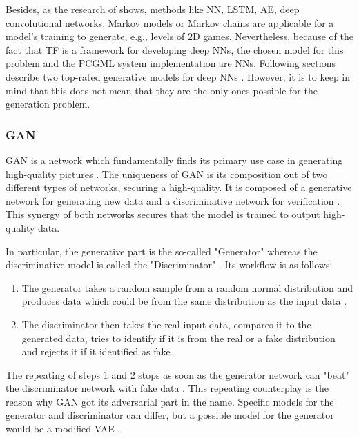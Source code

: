 \documentclass[MGS,Master,english]{twbook}%
\begin{document}
Besides, as the research of \cite{pcgml::paper} shows, methods like \ac{NN}, \ac{LSTM}, \ac{AE}, deep convolutional networks, Markov models or Markov chains are applicable for a model's training to generate, e.g., levels of \ac{2D} games. Nevertheless, because of the fact that \ac{TF} is a framework for developing deep \acp{NN}, the chosen model for this problem and the \ac{PCGML} system implementation are \acp{NN}. Following sections describe two top-rated generative models for deep \acp{NN} \cite{ml::vae::tutorial}. However, it is to keep in mind that this does not mean that they are the only ones possible for the generation problem.

\subsubsection{\acl{GAN}}
\ac{GAN} is a network which fundamentally finds its primary use case in generating high-quality pictures \cite{ml::book::developer}. The uniqueness of \ac{GAN} is its composition out of two different types of networks, securing a high-quality. It is composed of a generative network for generating new data and a discriminative network for verification \cite{ml::book::developer}. This synergy of both networks secures that the model is trained to output high-quality data. 

In particular, the generative part is the so-called "Generator" whereas the discriminative model is called the "Discriminator" \cite{ml::book::developer}. Its workflow is as follows:
\begin{enumerate}
	\item The generator takes a random sample from a random normal distribution and produces data which could be from the same distribution as the input data \cite{ml::book::developer}.
	\item The discriminator then takes the real input data, compares it to the generated data, tries to identify if it is from the real or a fake distribution and rejects it if it identified as fake \cite{ml::book::developer}.
\end{enumerate} 

The repeating of steps 1 and 2 stops as soon as the generator network can "beat" the discriminator network with fake data \cite{ml::book::developer}. This repeating counterplay is the reason why \ac{GAN} got its adversarial part in the name. Specific models for the generator and discriminator can differ, but a possible model for the generator would be a modified \ac{VAE} \cite{ml::book::nnProgrammingTF}.
\end{document}
